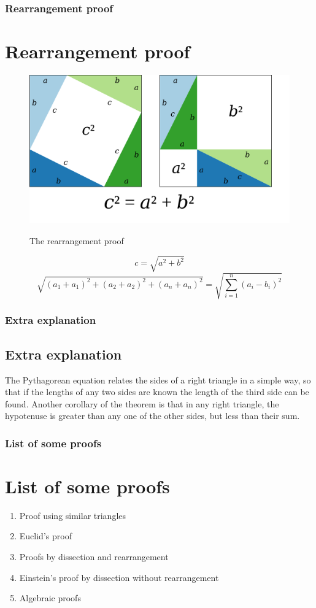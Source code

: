 \documentclass{beamer}
\begin{document}
\begin{frame}
\frametitle{Rearrangement proof}
\section{Rearrangement proof}
\label{sec1}
\begin{figure}[H]
    \centering
    \includegraphics[scale=0.12]{figs/Pythagoras-proof-anim.svg.png} \\
    \caption{The rearrangement proof}
    \label{fig:my_label}
\end{figure}
\begin{equation}
    c = \sqrt{a^2 + b^2}
\end{equation}
\begin{equation}
    \sqrt{(a_1 + a_1)^2 + (a_2 + a_2)^2 + (a_n + a_n)^2} = \sqrt{\sum_{i=1}^{n} (a_i - b_i)^2}
\end{equation}
\end{frame}
\begin{frame}
\frametitle{Extra explanation}
\subsection{Extra explanation}
The Pythagorean equation relates the sides of a right triangle in a simple way, so that if the lengths of any two sides are known the length of the third side can be found. Another corollary of the theorem is that in any right triangle, the hypotenuse is greater than any one of the other sides, but less than their sum.
\end{frame}

\begin{frame}
\frametitle{List of some proofs}
\section{List of some proofs}
\begin{enumerate}
     \item Proof using similar triangles
    \item Euclid's proof
    \item Proofs by dissection and rearrangement
    \item Einstein's proof by dissection without rearrangement
    \item Algebraic proofs
\end{enumerate}
\end{frame}
\end{document}
